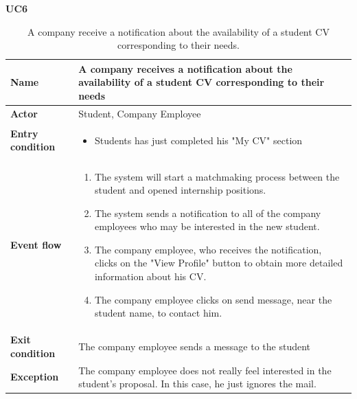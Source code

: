     \textbf{UC6}
    \nopagebreak
    \begin{table}[H]
        \centering
        \begin{tabular}{|l|p{11.9cm}|}
        \hline
        \textbf{Name}            & A company receives a notification about the availability of a student CV corresponding to their needs \\\hline
        \textbf{Actor}           & Student, Company Employee       \\\hline
        \textbf{Entry condition} &
        \begin{itemize}
              \item Students has just completed his "My CV" section
        \end{itemize}                                        \\\hline
        \textbf{Event flow}      &
        \begin{enumerate}[label=\arabic*.]
              \item The system will start a matchmaking process between the student and opened internship positions.
              \item The system sends a notification to all of the company employees who may be interested in the new student.
              \item The company employee, who receives the notification, clicks on the "View Profile" button to obtain more detailed information about his CV.
              \item The company employee clicks on send message, near the student name, to contact him.
              
        \end{enumerate}            \\\hline
        \textbf{Exit condition}  & The company employee sends a message to the student  \\\hline
        \textbf{Exception}       &  The company employee does not really feel interested in the student's proposal. In this case, he just ignores the mail.   \\\hline
        \end{tabular}
        \caption{A company receive a notification about the availability of a student CV corresponding to their needs.}
        \label{table:A company receive a notification about the availability of a student CV corresponding to their needs}
    \end{table}

